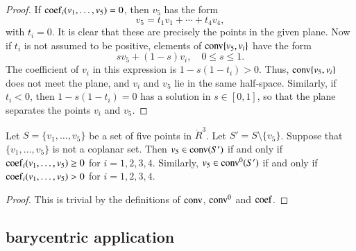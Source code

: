 \begin{tarskidata}
\begin{tarski}
\begin{proof}
If ${\operatorname{coef}}_i(v_1,\ldots,v_5)=0$, then $v_5$
has the form
	$$
	v_5 = t_1 v_1 + \cdots + t_4 v_4,
	$$
with $t_i=0$.  It is clear that these are
precisely the points in the given plane.
Now if $t_i$ is not assumed to be positive, 
elements of
${\operatorname{conv}}\{v_5,v_i\}$ have the form
	$$s v_5 + (1-s) v_i,\quad 0\le s \le 1.$$
The coefficient of $v_i$ in this expression
is $1-s(1-t_i)>0$.  Thus, ${\operatorname{conv}}\{v_5,v_i\}$
does not meet the plane, and $v_i$ and $v_5$
lie in the same half-space.  Similarly,
if $t_i<0$, then $1-s(1-t_i)=0$ has a solution
in $s\in[0,1]$, so that the plane separates the
points $v_i$ and $v_5$.
\end{proof}
\end{tarski}




\begin{tarski}

\begin{lemma}
Let $S=\{v_1,\ldots,v_5\}$ be
a set of five points in $\ring{R}^3$.  Let $S'=S\setminus\{v_5\}$.
Suppose
that $\{v_1,\ldots,v_5\}$ is not a coplanar
set.  Then $v_5\in{\operatorname{conv}}(S')$ if and only
if  
${\operatorname{coef}}_i(v_1,\ldots,v_5)\ge0$ 
for $i=1,2,3,4$.
Similarly, $v_5\in{\operatorname{conv}}^0(S')$ if and only
if  
${\operatorname{coef}}_i(v_1,\ldots,v_5)>0$ 
for $i=1,2,3,4$.
\end{lemma}

\begin{proof}  This is trivial by the definitions
of ${\operatorname{conv}}$, ${\operatorname{conv}}^0$ and ${\operatorname{coef}}$.
\end{proof}
\end{tarski}














\begin{tarski}
\subsection{barycentric application}


\end{tarski}
\end{tarskidata}
